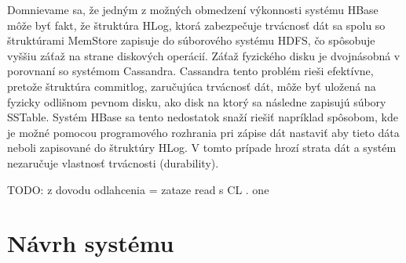 \documentclass[11pt,twoside,a4paper]{book}
\begin{document}
Domnievame sa, že jedným z možných obmedzení výkonnosti systému HBase môže byť fakt, že štruktúra HLog, ktorá zabezpečuje trvácnosť dát sa spolu so štruktúrami MemStore zapisuje do súborového systému HDFS, čo spôsobuje vyššiu záťaž na strane diskových operácií. Záťaž fyzického disku je dvojnásobná v porovnaní so systémom Cassandra. Cassandra tento problém rieši efektívne, pretože štruktúra commitlog, zaručujúca trvácnosť dát, môže byť uložená na fyzicky odlišnom pevnom disku, ako disk na ktorý sa následne zapisujú súbory SSTable. Systém HBase sa tento nedostatok snaží riešiť napríklad spôsobom, kde je možné pomocou programového rozhrania pri zápise dát nastaviť aby tieto dáta neboli zapisované do štruktúry HLog. V tomto prípade hrozí strata dát a systém nezaručuje vlastnosť trvácnosti (durability).


TODO: z dovodu odlahcenia = zataze read s CL . one




% 
% 
% 


% 
% 
% 

\chapter{Návrh systému}
\end{document}

